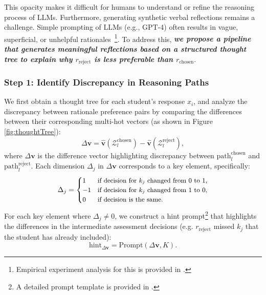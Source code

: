 This opacity makes it difficult for humans to understand or refine the reasoning process of LLMs. Furthermore, generating synthetic verbal reflections remains a challenge. Simple prompting of LLMs (e.g., GPT-4) often results in vague, superficial, or unhelpful rationales~\cite{Yin2024RelativePO, Jiang2024BridgingAM}\footnote{Empirical experiment analysis for this is provided in \textsection{\ref{sec:main_exps}}.}.
To address this, \textbf{\emph{we propose a pipeline that generates meaningful reflections based on a structured thought tree to explain why \( r_{\text{reject}} \) is less preferable than \( r_{\text{chosen}} \)}}.

\subsubsection*{Step 1: Identify Discrepancy in Reasoning Paths}
We first obtain a thought tree for each student's response \(x_i\), and analyze the discrepancy between rationale preference pairs by comparing the differences between their corresponding multi-hot vectors (as shown in Figure \ref{fig:thoughtTree}):
\begin{equation}
    \Delta\mathbf{v} = \hat{\mathbf{v}}(\mathcal{Z}_{l}^{\text{chosen}}) - \hat{\mathbf{v}}(\mathcal{Z}_{l}^{\text{reject}}),
\end{equation}
where $\Delta\mathbf{v}$ is the difference vector highlighting discrepancy between $\text{path}_l^{\text{chosen}}$ and $\text{path}_l^{\text{reject}}$. Each dimension $\Delta_j$ in $\Delta\mathbf{v}$ corresponds to a key element, specifically:
\[
\small
\Delta_j = 
\begin{cases} 
1 & \text{if decision for } k_j \text{ changed from 0 to 1}, \\ 
-1 & \text{if decision for } k_j \text{ changed from 1 to 0}, \\ 
0 & \text{if decision is the same}.
\end{cases}
\]
For each key element where \( \Delta_j \neq 0 \), we construct a hint prompt\footnote{A detailed prompt template is provided in \textsection{\ref{sec:further_experiment_setup}}.} that highlights the differences in the intermediate assessment decisions (e.g. \(r_{\text{reject}}\) missed $k_j$ that the student has already included):
\begin{equation}
    \text{hint}_{\Delta\mathbf{v}} = \text{Prompt}(\Delta\mathbf{v}, K).
\end{equation}

